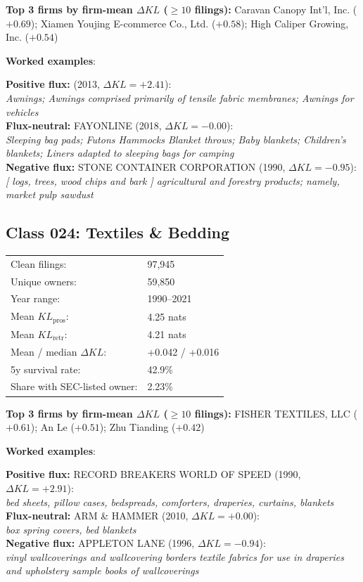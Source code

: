 \textbf{Top 3 firms by firm-mean $\Delta KL$ ($\geq 10$ filings):} Caravan Canopy Int'l, Inc. ($+0.69$); Xiamen Youjing E-commerce Co., Ltd. ($+0.58$); High Caliper Growing, Inc. ($+0.54$)

\textbf{Worked examples}:

  \textbf{Positive flux:} \textsc{} (2013, $\Delta KL=+2.41$):\\
  \textit{Awnings; Awnings comprised primarily of tensile fabric membranes; Awnings for vehicles}\\
  \textbf{Flux-neutral:} \textsc{FAYONLINE} (2018, $\Delta KL=-0.00$):\\
  \textit{Sleeping bag pads; Futons Hammocks Blanket throws; Baby blankets; Children's blankets; Liners adapted to sleeping bags for camping}\\
  \textbf{Negative flux:} \textsc{STONE CONTAINER CORPORATION} (1990, $\Delta KL=-0.95$):\\
  \textit{[ logs, trees, wood chips and bark ] agricultural and forestry products; namely, market pulp sawdust}\\

\subsection*{Class 024: Textiles \& Bedding}
\label{app:industry-024}

\begin{tabular}{ll}
Clean filings: & 97,945 \\
Unique owners: & 59,850 \\
Year range: & 1990--2021 \\
Mean $KL_\text{pros}$: & 4.25 nats \\
Mean $KL_\text{retr}$: & 4.21 nats \\
Mean / median $\Delta KL$: & +0.042 / +0.016 \\
5y survival rate: & 42.9\% \\
Share with SEC-listed owner: & 2.23\% \\
\end{tabular}

\textbf{Top 3 firms by firm-mean $\Delta KL$ ($\geq 10$ filings):} FISHER TEXTILES, LLC ($+0.61$); An Le ($+0.51$); Zhu Tianding ($+0.42$)

\textbf{Worked examples}:

  \textbf{Positive flux:} \textsc{RECORD BREAKERS WORLD OF SPEED} (1990, $\Delta KL=+2.91$):\\
  \textit{bed sheets, pillow cases, bedspreads, comforters, draperies, curtains, blankets}\\
  \textbf{Flux-neutral:} \textsc{ARM \& HAMMER} (2010, $\Delta KL=+0.00$):\\
  \textit{box spring covers, bed blankets}\\
  \textbf{Negative flux:} \textsc{APPLETON LANE} (1996, $\Delta KL=-0.94$):\\
  \textit{vinyl wallcoverings and wallcovering borders textile fabrics for use in draperies and upholstery sample books of wallcoverings}\\

